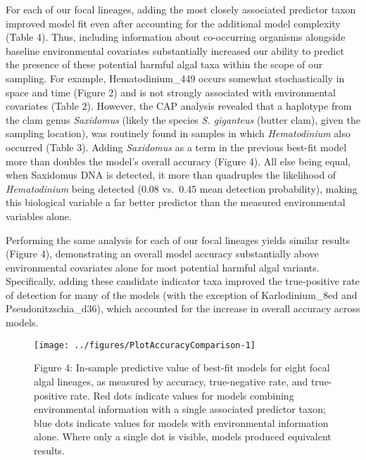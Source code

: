 \documentclass[
]{article}
\begin{document}
For each of our focal lineages, adding the most closely associated
predictor taxon improved model fit even after accounting for the
additional model complexity (Table 4). Thus, including information about
co-occurring organisms alongside baseline environmental covariates
substantially increased our ability to predict the presence of these
potential harmful algal taxa within the scope of our sampling. For
example, Hematodinium\_449 occurs somewhat stochastically in space and
time (Figure 2) and is not strongly associated with environmental
covariates (Table 2). However, the CAP analysis revealed that a
haplotype from the clam genus \emph{Saxidomus} (likely the species
\emph{S. giganteus} (butter clam), given the sampling location), was
routinely found in samples in which \emph{Hematodinium} also occurred
(Table 3). Adding \emph{Saxidomus} as a term in the previous best-fit
model more than doubles the model's overall accuracy (Figure 4). All
else being equal, when Saxidomus DNA is detected, it more than
quadruples the likelihood of \emph{Hematodinium} being detected (0.08
vs.~0.45 mean detection probability), making this biological variable a
far better predictor than the measured environmental variables alone.

Performing the same analysis for each of our focal lineages yields
similar results (Figure 4), demonstrating an overall model accuracy
substantially above environmental covariates alone for most potential
harmful algal variants. Specifically, adding these candidate indicator
taxa improved the true-positive rate of detection for many of the models
(with the exception of Karlodinium\_8ed and Pseudonitzschia\_d36), which
accounted for the increase in overall accuracy across models.

\begin{figure}

{\centering \texttt{[image: ../figures/PlotAccuracyComparison-1]} 

}

\caption{Figure 4: In-sample predictive value of best-fit models for eight focal algal lineages, as measured by accuracy, true-negative rate, and true-positive rate. Red dots indicate values for models combining environmental information with a single associated predictor taxon; blue dots indicate values for models with environmental information alone. Where only a single dot is visible, models produced equivalent results.}\label{fig:PlotAccuracyComparison}
\end{figure}

\small
\end{document}
